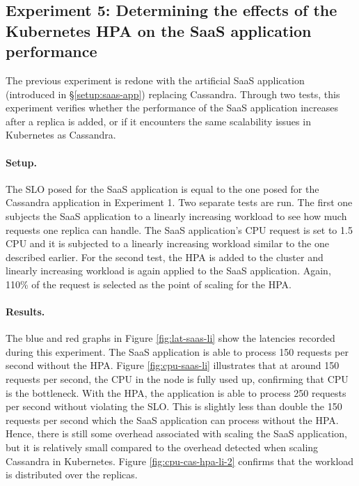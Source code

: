 \subsection{Experiment 5: Determining the effects of the Kubernetes HPA on the SaaS application performance}
The previous experiment is redone with the artificial SaaS application (introduced in \S\ref{setup:saas-app}) replacing Cassandra. Through two tests, this experiment verifies whether the performance of the SaaS application increases after a replica is added, or if it encounters the same scalability issues in Kubernetes as Cassandra.  

\paragraph{Setup.}
The SLO posed for the SaaS application is equal to the one posed for the Cassandra application in Experiment 1. Two separate tests are run. The first one subjects the SaaS application to a linearly increasing workload to see how much requests one replica can handle. The SaaS application's CPU request is set to 1.5 CPU and it is subjected to a linearly increasing workload similar to the one described earlier. For the second test, the HPA is added to the cluster and linearly increasing workload is again applied to the SaaS application. Again, 110\% of the request is selected as the point of scaling for the HPA. 


\paragraph{Results.}
The blue and red graphs in Figure \ref{fig:lat-saas-li} show the latencies recorded during this experiment. The SaaS application is able to process 150 requests per second without the HPA. Figure \ref{fig:cpu-saas-li} illustrates that at around 150 requests per second, the CPU in the node is fully used up, confirming that CPU is the bottleneck. With the HPA, the application is able to process 250 requests per second without violating the SLO. This is slightly less than double the 150 requests per second which the SaaS application can process without the HPA. Hence, there is still some overhead associated with scaling the SaaS application, but it is relatively small compared to the overhead detected when scaling Cassandra in Kubernetes. Figure \ref{fig:cpu-cas-hpa-li-2} confirms that the workload is distributed over the replicas.

